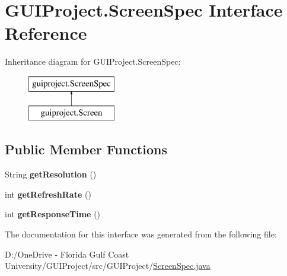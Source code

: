 \hypertarget{interface_g_u_i_project_1_1_screen_spec}{}\section{G\+U\+I\+Project.\+Screen\+Spec Interface Reference}
\label{interface_g_u_i_project_1_1_screen_spec}
Inheritance diagram for G\+U\+I\+Project.\+Screen\+Spec\+:\begin{figure}[H]
\begin{center}
\leavevmode
\includegraphics[height=2.000000cm]{interface_g_u_i_project_1_1_screen_spec}
\end{center}
\end{figure}
\subsection*{Public Member Functions}
\begin{DoxyCompactItemize}
\item 
\mbox{\label{interface_g_u_i_project_1_1_screen_spec_a3a4f42b213585b8a4ab8bd078749f95e}} 
String {\bfseries get\+Resolution} ()
\item 
\mbox{\label{interface_g_u_i_project_1_1_screen_spec_a3439300f3f3dcaf3185a1beb1189e166}} 
int {\bfseries get\+Refresh\+Rate} ()
\item 
\mbox{\label{interface_g_u_i_project_1_1_screen_spec_a440865466949b1d8be8545d29159b1f9}} 
int {\bfseries get\+Response\+Time} ()
\end{DoxyCompactItemize}


The documentation for this interface was generated from the following file\+:\begin{DoxyCompactItemize}
\item 
D\+:/\+One\+Drive -\/ Florida Gulf Coast University/\+G\+U\+I\+Project/src/\+G\+U\+I\+Project/\mbox{\hyperlink{_screen_spec_8java}{Screen\+Spec.\+java}}\end{DoxyCompactItemize}
